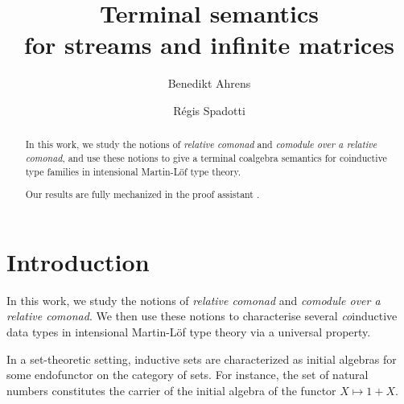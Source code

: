 \documentclass{amsart}
\author{Benedikt Ahrens}
\author{R\'egis Spadotti}
\title[Terminal semantics]{Terminal semantics \\ for streams and infinite matrices}
\begin{document}
\begin{abstract}


 In this work, we study the notions of \emph{relative comonad} and \emph{comodule over a relative comonad}, and  
 use these notions to give a terminal coalgebra semantics for coinductive type families in 
 intensional Martin-L\"of type theory.
 
    
  
  

%   
  
  Our results are fully mechanized in the proof assistant \coq.
  \end{abstract}

\maketitle

\tableofcontents

\section{Introduction}
 
 In this work, we study the notions of \emph{relative comonad} and \emph{comodule over a relative comonad}.
 We then use these notions to characterise several \emph{co}inductive data types in intensional Martin-L\"of type theory
 via a universal property.
 
 In a set-theoretic setting, inductive sets are characterized as initial algebras for 
 some endofunctor on the category of sets. For instance, the set of natural numbers constitutes the carrier of the 
 initial algebra of the functor $X \mapsto 1 + X$.
 
\end{document}
